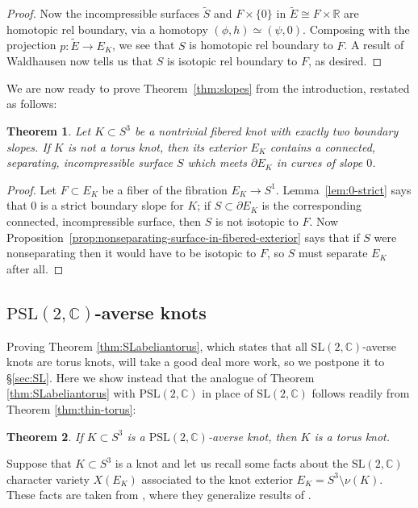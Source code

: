 \documentclass[11pt]{amsart}
\newtheorem {theorem}{Theorem}
\numberwithin{equation}{section}
\numberwithin{theorem}{section}
\theoremstyle{definition}
\newcommand{\R}{\mathbb{R}}
\newcommand{\C}{\mathbb{C}}
\newcommand\SL{\mathrm{SL}}
\newcommand\PSL{\mathrm{PSL}}
\begin{document}
\begin{proof}
Now the incompressible surfaces $\tilde{S}$ and $F\times \{0\}$ in $\tilde{E} \cong F\times\R$ are homotopic rel boundary, via a homotopy $(\phi,h)\simeq (\psi,0)$.  Composing with the projection $p:\tilde{E} \to E_K$, we see that $S$ is homotopic rel boundary to $F$.  A result of Waldhausen \cite[Corollary~5.5]{waldhausen} now tells us that $S$ is isotopic rel boundary to $F$, as desired.
\end{proof}

We are now ready to prove Theorem~\ref{thm:slopes} from the introduction, restated as follows:

\begin{theorem} \label{thm:two-slopes}
Let $K \subset S^3$ be a nontrivial fibered knot with exactly two boundary slopes.  If $K$ is not a torus knot, then its exterior $E_K$ contains a connected, separating, incompressible surface $S$ which meets $\partial E_K$ in curves of slope $0$.
\end{theorem}

\begin{proof}
Let $F \subset E_K$ be a fiber of the fibration $E_K \to S^1$.  Lemma~\ref{lem:0-strict} says that $0$ is a strict boundary slope for $K$; if $S \subset \partial E_K$ is the corresponding connected, incompressible surface, then $S$ is not isotopic to $F$.  Now Proposition~\ref{prop:nonseparating-surface-in-fibered-exterior} says that if $S$ were nonseparating then it would have to be isotopic to $F$, so $S$ must separate $E_K$ after all.
\end{proof}


\subsection{$\PSL(2,\C)$-averse knots}

Proving Theorem \ref{thm:SLabeliantorus}, which states that all $\SL(2,\C)$-averse knots are torus knots, will take a good deal more work, so we postpone it to \S\ref{sec:SL}.  Here we show instead that the analogue of Theorem \ref{thm:SLabeliantorus} with $\PSL(2,\C)$ in place of $\SL(2,\C)$ follows readily from Theorem \ref{thm:thin-torus}:

\begin{theorem} \label{thm:psl2-averse}
If $K \subset S^3$ is a $\PSL(2,\C)$-averse knot, then $K$ is a torus knot.
\end{theorem}

Suppose that $K\subset S^3$ is a knot and let us  recall some facts about the $\SL(2,\C)$ character variety $X(E_K)$ associated to the knot exterior $E_K = S^3\setminus\nu(K)$.  These facts are taken from \cite[\S5]{boyer-zhang-seminorms}, where they generalize results of \cite[\S1]{cgls}.
\end{document}
